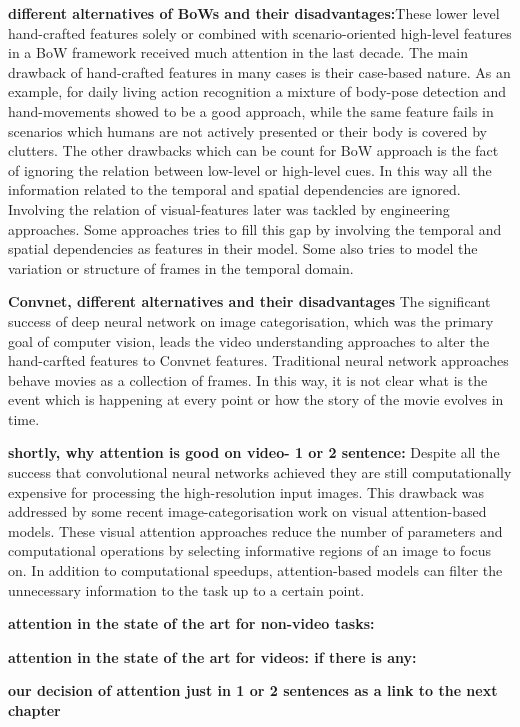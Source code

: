 \documentclass{article} %
\begin{document}
\textbf{different alternatives of BoWs and their disadvantages:}These lower level hand-crafted features solely or combined with scenario-oriented high-level features in a BoW framework received much attention in the last decade. The main drawback of hand-crafted features in many cases is their case-based nature. As an example, for daily living action recognition a mixture of body-pose detection and hand-movements showed to be a good approach, while the same feature fails in scenarios which humans are not actively presented or their body is covered by clutters. The other drawbacks which can be count for BoW approach is the fact of ignoring the relation between low-level or high-level cues. In this way all the information related to the temporal and spatial dependencies are ignored. Involving the relation of visual-features later was tackled by engineering approaches. Some approaches tries to fill this gap by involving the temporal and spatial dependencies as features in their model. Some also tries to model the variation or structure of frames in the temporal domain. 

\textbf{Convnet, different alternatives and their disadvantages} The significant success of deep neural network on image categorisation, which was the primary goal of computer vision, leads the video understanding approaches to alter the hand-carfted features to  Convnet features. Traditional neural network approaches behave movies as a collection of frames. In this way, it is not clear what is the event which is happening at every point or how the story of the movie evolves in time.

\textbf{shortly, why attention is good on video- 1 or 2 sentence:}
Despite all the success that convolutional neural networks achieved they are still computationally expensive for processing the high-resolution input images. This drawback was addressed by some recent image-categorisation work on visual attention-based models. These visual attention approaches reduce the number of parameters and computational operations by selecting informative regions of an image to focus on. In addition to computational speedups, attention-based models can filter the unnecessary information to the task up to a certain point.

\textbf{attention in the state of the art for non-video tasks:}

\textbf{attention in the state of the art for videos: if there is any:}

\textbf{our decision of attention just in 1 or 2 sentences as a link to the next chapter}
\end{document}
